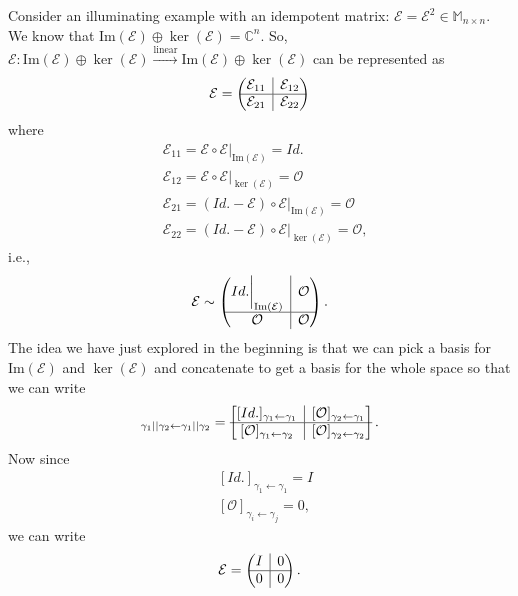 \documentclass{article}
\theoremstyle{definition}
\newcommand{\E}{\mathcal{E}}
\newcommand{\ima}{\text{Im}}
\newcommand{\lin}{\overset{\text{linear}}{\longrightarrow}}
\newcommand{\rvline}{\hspace*{-\arraycolsep}\vline\hspace*{-\arraycolsep}}
\begin{document}
Consider an illuminating example with an idempotent matrix: $\E = \E^2 \in \mathbb{M}_{n\times n}$. We know that $\ima(\E) \oplus \ker(\E) = \mathbb{C}^n$. So, $\E : \ima(\E) \oplus \ker(\E) \lin \ima(\E) \oplus \ker(\E)$ can be represented as
\begin{align*}
\E =
\begin{pmatrix}
\E_{11} & \rvline & \E_{12}\\
\hline
\E_{21} & \rvline & \E_{22}
\end{pmatrix}
\end{align*} 
where 
\begin{align*}
&\E_{11} = \E \circ \E\bigg\vert_{\ima(\E)} = Id.\\
&\E_{12} = \E \circ \E\bigg\vert_{\ker(\E)} = \mathcal{O}\\
&\E_{21} = (Id. - \E) \circ \E \bigg\vert_{\ima(\E)} = \mathcal{O}\\
&\E_{22} = (Id. - \E) \circ \E \bigg\vert_{\ker(\E)} = \mathcal{O},
\end{align*}
i.e.,
\begin{align*}
\E \sim \begin{pmatrix}
Id.\bigg\vert_{\ima(\E)} & \rvline & \mathcal{O}\\
\hline
\mathcal{O} & \rvline & \mathcal{O}
\end{pmatrix}.
\end{align*}
The idea we have just explored in the beginning is that we can pick a basis for $\ima(\E)$ and $\ker(\E)$ and concatenate to get a basis for the whole space so that we can write
\begin{align*}
[\E]_{\gamma_1||\gamma_2 \leftarrow \gamma_1||\gamma_2} =
\begin{bmatrix}
[Id.]_{\gamma_1\leftarrow \gamma_1} & \rvline & [\mathcal{O}]_{\gamma_2 \leftarrow \gamma_1}\\
\hline
[\mathcal{O}]_{\gamma_1 \leftarrow \gamma_2} & \rvline & [\mathcal{O}]_{\gamma_2 \leftarrow \gamma_2}
\end{bmatrix}.
\end{align*}
Now since
\begin{align*}
&[Id.]_{\gamma_1\leftarrow \gamma_1} = I\\
&[\mathcal{O}]_{\gamma_i \leftarrow \gamma_j} = 0,
\end{align*}
we can write
\begin{align*}
\E = 
\begin{pmatrix}
I & \rvline & 0\\
\hline
0 & \rvline & 0
\end{pmatrix}.
\end{align*}
\end{document}
